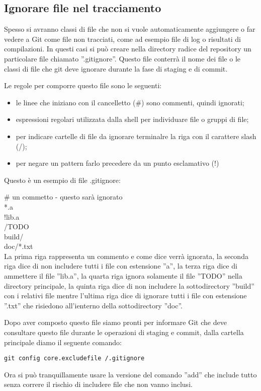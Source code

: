 \subsection{Ignorare file nel tracciamento}
Spesso si avranno classi di file che non si vuole automaticamente aggiungere o far vedere a Git come file non tracciati, come ad esempio file di log o risultati di compilazioni. In questi casi si può creare nella directory radice del repository un particolare file chiamato ''.gitignore''. Questo file conterrà il nome dei file o le classi di file che git deve ignorare durante la fase di staging e di commit.

Le regole per comporre questo file sono le seguenti:

\begin{itemize}
\item le linee che iniziano con il cancelletto (\#)  sono commenti, quindi ignorati;
\item espressioni regolari utilizzata dalla shell per individuare file o gruppi di file;
\item per indicare cartelle di file da ignorare terminalre la riga con il carattere slash (/);
\item per negare un pattern farlo precedere da un punto esclamativo (!)
\end{itemize}

Questo è un esempio di file .gitignore:

\# un commetto - questo sarà ignorato\\
*.a\\
!lib.a\\
/TODO\\
build/\\
doc/*.txt\\

La prima riga rappresenta un commento e come dice verrà ignorata, la seconda riga dice di non includere tutti i file con estensione ''a'', la terza riga dice di ammettere il file ''lib.a'', la quarta riga ignora solamente il file ''TODO'' nella directory principale, la quinta riga dice di non includere la sottodirectory ''build'' con i relativi file mentre l'ultima riga dice di ignorare tutti i file con estensione ''.txt'' che risiedono all'ienterno della sottodirectory ''doc''.

Dopo aver composto questo file siamo pronti per informare Git che deve consultare questo file durante le operazioni di staging e commit, dalla cartella principale diamo il seguente comando:

\begin{center}
\texttt{git config core.excludefile /.gitignore}
\end{center}

Ora si può tranquillamente usare la versione del comando ''add'' che include tutto senza correre il rischio di includere file che non vanno inclusi.
